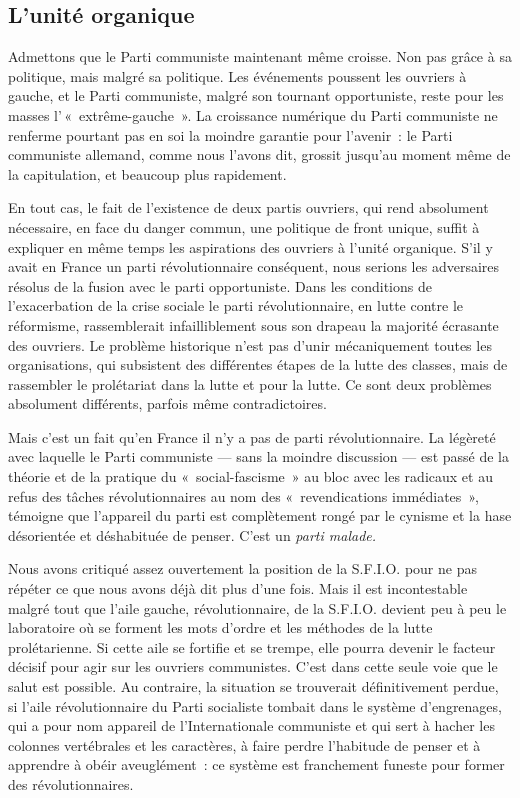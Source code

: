 \documentclass[french,twoside]{book} %
\begin{document}
\subsection[{L’unité organique}]{L’unité organique}
\noindent Admettons que le Parti communiste maintenant même croisse. Non pas grâce à sa politique, mais malgré sa politique. Les événements poussent les ouvriers à gauche, et le Parti communiste, malgré son tournant opportuniste, reste pour les masses l’ « extrême-gauche ». La croissance numérique du Parti communiste ne renferme pourtant pas en soi la moindre garantie pour l’avenir : le Parti communiste allemand, comme nous l’avons dit, grossit jusqu’au moment même de la capitulation, et beaucoup plus rapidement.\par
En tout cas, le fait de l’existence de deux partis ouvriers, qui rend absolument nécessaire, en face du danger commun, une politique de front unique, suffit à expliquer en même temps les aspirations des ouvriers à l’unité organique. S’il y avait en France un parti révolutionnaire conséquent, nous serions les adversaires résolus de la fusion avec le parti opportuniste. Dans les conditions de l’exacerbation de la crise sociale le parti révolutionnaire, en lutte contre le réformisme, rassemblerait infailliblement sous son drapeau la majorité écrasante des ouvriers. Le problème historique n’est pas d’unir mécaniquement toutes les organisations, qui subsistent des différentes étapes de la lutte des classes, mais de rassembler le prolétariat dans la lutte et pour la lutte. Ce sont deux problèmes absolument différents, parfois même contradictoires.\par
Mais c’est un fait qu’en France il n’y a pas de parti révolutionnaire. La légèreté avec laquelle le Parti communiste — sans la moindre discussion — est passé de la  théorie et de la pratique du « social-fascisme » au bloc avec les radicaux et au refus des tâches révolutionnaires au nom des « revendications immédiates », témoigne que l’appareil du parti est complètement rongé par le cynisme et la hase désorientée et déshabituée de penser. C’est un \emph{parti malade.}\par
Nous avons critiqué assez ouvertement la position de la S.F.I.O. pour ne pas répéter ce que nous avons déjà dit plus d’une fois. Mais il est incontestable malgré tout que l’aile gauche, révolutionnaire, de la S.F.I.O. devient peu à peu le laboratoire où se forment les mots d’ordre et les méthodes de la lutte prolétarienne. Si cette aile se fortifie et se trempe, elle pourra devenir le facteur décisif pour agir sur les ouvriers communistes. C’est dans cette seule voie que le salut est possible. Au contraire, la situation se trouverait définitivement perdue, si l’aile révolutionnaire du Parti socialiste tombait dans le système d’engrenages, qui a pour nom appareil de l’Internationale communiste et qui sert à hacher les colonnes vertébrales et les caractères, à faire perdre l’habitude de penser et à apprendre à obéir aveuglément : ce système est franchement funeste pour former des révolutionnaires.\par
\end{document}
